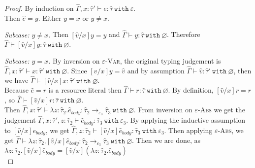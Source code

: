\documentclass{llncs}
\newcommand{\keywadj}[1]{\mathtt{#1}}
\newcommand{\keyw}[1]{\keywadj{#1}~}
\newcommand{\kw}[1]{\keyw{ #1 }}
\begin{document}
\begin{proof}

By induction on $\hat \Gamma, x: \hat \tau' \vdash e: \hat \tau~\kw{with} \varepsilon$. \\

\noindent
{} Then $\hat e = y$. Either $y = x$ or $y \neq x$.

\textit{Subcase: $y \neq x$.} Then $[\hat v/x]y = y$ and $\hat \Gamma \vdash y: \hat \tau~\kw{with} \varnothing$. Therefore $\hat \Gamma \vdash [\hat v/x]y: \hat \tau~\kw{with} \varnothing$.

\textit{Subcase: $y = x$.} By inversion on \textsc{$\varepsilon$-Var}, the original typing judgement is $\hat \Gamma, x: \hat \tau' \vdash x: \hat \tau'~\kw{with} \varnothing$. Since $[\hat v/x]y = \hat v$ and by assumption $\hat \Gamma \vdash \hat v: \hat \tau'~\kw{with} \varnothing$, then we have $\hat \Gamma \vdash [\hat v/x]x: \hat \tau'~\kw{with} \varnothing$. \\

\noindent
{} Because $\hat e = r$ is a resource literal then $\hat \Gamma \vdash r: \hat \tau~\kw{with} \varnothing$. By definition, $[\hat v/x]r = r$, so $\hat \Gamma \vdash [\hat v/x]r: \hat \tau~\kw{with} \varnothing$. \\

\noindent
{} Then $\hat \Gamma, x: \hat \tau' \vdash \lambda z: \hat \tau_2 . \hat e_{body}: \hat \tau_2 \rightarrow_{\varepsilon_3} \hat \tau_3~\kw{with} \varnothing$. From inversion on \textsc{$\varepsilon$-Abs} we get the judgement $\hat \Gamma, x: \hat \tau', z: \hat \tau_2 \vdash \hat e_{body}: \hat \tau_3~\kw{with} \varepsilon_3$. By applying the inductive assumption to $[\hat v/x]e_{body}$, we get $\hat \Gamma, z: \hat \tau_2 \vdash  [\hat v/x]\hat e_{body}: \hat \tau_3~\kw{with} \varepsilon_3$. Then applying \textsc{$\varepsilon$-Abs}, we get $\hat \Gamma \vdash \lambda z: \hat \tau_2 . [\hat v/x]\hat e_{body} : \hat \tau_2 \rightarrow_{\varepsilon_3} \hat \tau_3~\kw{with} \varnothing$. Then we are done, as $\lambda z: \hat \tau_2.[\hat v/x]\hat e_{body} = [\hat v/x](\lambda z: \hat \tau_2.\hat e_{body})$ \\


\end{proof}
\end{document}

